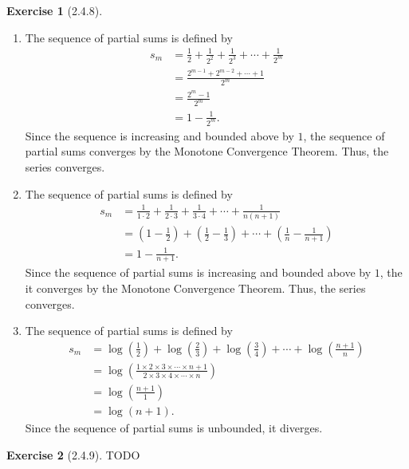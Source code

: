 \documentclass{amsart}
\theoremstyle{definition}
\newtheorem{exercise}{Exercise}
\begin{document}
\begin{exercise}[2.4.8]
  \begin{enumerate}[label={(\alph*)}]
    \item The sequence of partial sums is defined by
      \begin{align*}
        s_m &= \frac{1}{2} + \frac{1}{2^2} + \frac{1}{2^3} + \cdots +
        \frac{1}{2^m} \\
        &= \frac{2^{m-1} + 2^{m-2} + \cdots + 1}{2^m} \\
        &= \frac{2^m - 1}{2^m} \\
        &= 1 - \frac{1}{2^m}.
      \end{align*}
      Since the sequence is increasing and bounded above
      by $1$, the sequence of partial sums converges by the Monotone Convergence
      Theorem. Thus, the series converges.
    \item The sequence of partial sums is defined by
      \begin{align*}
        s_m &= \frac{1}{1 \cdot 2} + \frac{1}{2 \cdot 3} + \frac{1}{3 \cdot 4} +
        \cdots + \frac{1}{n (n + 1)} \\
        &= \left(1 - \frac{1}{2}\right) + \left(\frac{1}{2} - \frac{1}{3}\right)
        + \cdots + \left(\frac{1}{n} - \frac{1}{n + 1}\right) \\
        &= 1 - \frac{1}{n + 1}.
      \end{align*}
      Since the sequence of partial sums is increasing and bounded above by $1$,
      the it converges by the Monotone Convergence Theorem. Thus, the series
      converges.
    \item The sequence of partial sums is defined by
      \begin{align*}
        s_m &= \log\left(\frac{1}{2}\right) + \log\left(\frac{2}{3}\right) +
        \log\left(\frac{3}{4}\right) + \cdots + \log\left(\frac{n+1}{n}\right)
        \\
        &= \log\left(\frac{1 \times 2 \times 3 \times \cdots \times n + 1}{2
        \times 3 \times 4 \times \cdots \times n}\right) \\
        &= \log\left(\frac{n + 1}{1}\right) \\
        &= \log(n+1).
      \end{align*}
      Since the sequence of partial sums is unbounded, it diverges.
  \end{enumerate}
\end{exercise}

\begin{exercise}[2.4.9]
  TODO
\end{exercise}
\end{document}
